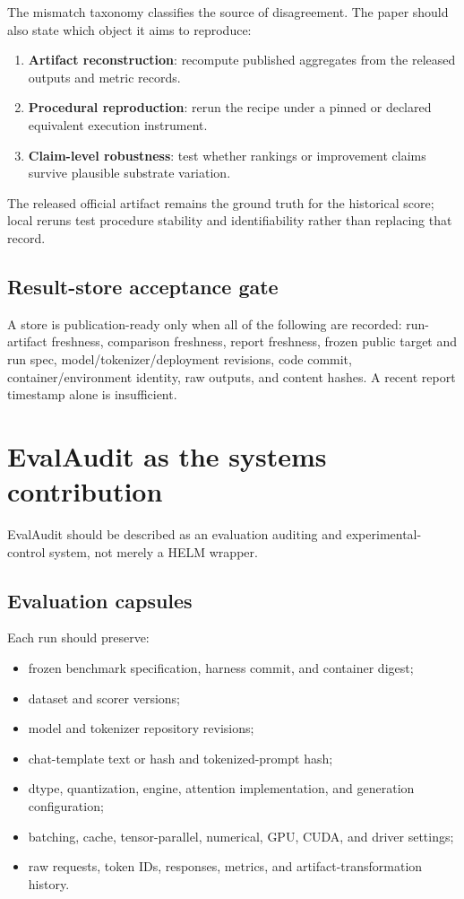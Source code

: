 \documentclass[11pt]{article}
\begin{document}
The mismatch taxonomy classifies the source of disagreement. The paper should also
state which object it aims to reproduce:
\begin{enumerate}
  \item \textbf{Artifact reconstruction}: recompute published aggregates from the
        released outputs and metric records.
  \item \textbf{Procedural reproduction}: rerun the recipe under a pinned or declared
        equivalent execution instrument.
  \item \textbf{Claim-level robustness}: test whether rankings or improvement claims
        survive plausible substrate variation.
\end{enumerate}
The released official artifact remains the ground truth for the historical score;
local reruns test procedure stability and identifiability rather than replacing that
record.

\subsection{Result-store acceptance gate}

A store is publication-ready only when all of the following are recorded: run-artifact
freshness, comparison freshness, report freshness, frozen public target and run spec,
model/tokenizer/deployment revisions, code commit, container/environment identity,
raw outputs, and content hashes. A recent report timestamp alone is insufficient.

\section{EvalAudit as the systems contribution}

EvalAudit should be described as an evaluation auditing and experimental-control system, not merely a HELM wrapper.

\subsection{Evaluation capsules}

Each run should preserve:

\begin{itemize}
  \item frozen benchmark specification, harness commit, and container digest;
  \item dataset and scorer versions;
  \item model and tokenizer repository revisions;
  \item chat-template text or hash and tokenized-prompt hash;
  \item dtype, quantization, engine, attention implementation, and generation configuration;
  \item batching, cache, tensor-parallel, numerical, GPU, CUDA, and driver settings;
  \item raw requests, token IDs, responses, metrics, and artifact-transformation history.
\end{itemize}
\end{document}
